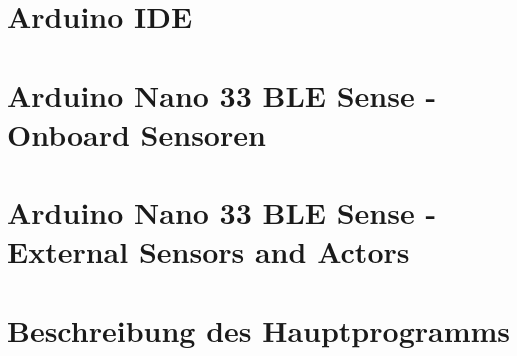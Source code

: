 \documentclass[10pt,a4paper,bibliography=totoc]{scrbook}
\begin{document}


\tableofcontents
\cleardoublepage

\listoffigures
\cleardoublepage

\listofcodes
\cleardoublepage

\cleardoublepage


  



{
\part{Arduino IDE}

      
  
   
  
}



{


\part{Arduino Nano 33 BLE Sense - Onboard Sensoren}

  

}


{

\part{Arduino Nano 33 BLE Sense - External  Sensors and Actors}

 
 
  
  
  
  
  
  
  
  
  
}

{
	\part{Beschreibung des Hauptprogramms}
	
	
}
\end{document}
